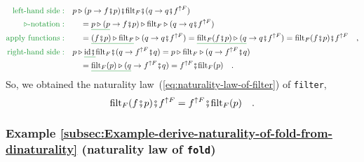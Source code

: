 \begin{align*}
{\color{greenunder}\text{left-hand side}:}\quad & p\triangleright(p\rightarrow f\bef p)\bef\text{filt}_{F}\bef(q\rightarrow q\bef f^{\uparrow F})\\
{\color{greenunder}\triangleright\text{-notation}:}\quad & \quad=\gunderline{p\triangleright(p}\rightarrow f\bef p)\triangleright\text{filt}_{F}\triangleright(q\rightarrow q\bef f^{\uparrow F})\\
{\color{greenunder}\text{apply functions}:}\quad & \quad=\gunderline{(f\bef p)\triangleright\text{filt}_{F}}\triangleright(q\rightarrow q\bef f^{\uparrow F})=\gunderline{\text{filt}_{F}(f\bef p)\triangleright(q}\rightarrow q\bef f^{\uparrow F})=\text{filt}_{F}(f\bef p)\bef f^{\uparrow F}\quad,\\
{\color{greenunder}\text{right-hand side}:}\quad & p\triangleright\gunderline{\text{id}\bef}\text{filt}_{F}\bef(q\rightarrow f^{\uparrow F}\bef q)=p\triangleright\text{filt}_{F}\triangleright(q\rightarrow f^{\uparrow F}\bef q)\\
 & \quad=\gunderline{\text{filt}_{F}(p)\triangleright(q}\rightarrow f^{\uparrow F}\bef q)=f^{\uparrow F}\bef\text{filt}_{F}(p)\quad.
\end{align*}
So, we obtained the naturality law~(\ref{eq:naturality-law-of-filter})
of \lstinline!filter!,
\[
\text{filt}_{F}(f\bef p)\bef f^{\uparrow F}=f^{\uparrow F}\bef\text{filt}_{F}(p)\quad.
\]


\subsubsection{Example \label{subsec:Example-derive-naturality-of-fold-from-dinaturality}\ref{subsec:Example-derive-naturality-of-fold-from-dinaturality}
(naturality law of \lstinline!fold!)}


